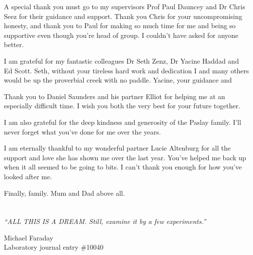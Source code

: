A special thank you must go to my supervisors Prof Paul Dauncey and Dr Chris Seez for their guidance and support. 
Thank you Chris for your uncompromising honesty, and thank you to Paul for making so much time for me and being so supportive even though you're head of group. I couldn't have asked for anyone better.

I am grateful for my fantastic colleagues Dr Seth Zenz, Dr Yacine Haddad and Ed Scott. 
Seth, without your tireless hard work and dedication I and many others would be up the proverbial creek with no paddle.
Yacine, your guidance and 

Thank you to Daniel Saunders and his partner Elliot for helping me at an especially difficult time.
I wish you both the very best for your future together.

I am also grateful for the deep kindness and generosity of the Paslay family. I'll never forget what you've done for me over the years. 

I am eternally thankful to my wonderful partner Lucie Altenburg for all the support and love she has shown me over the last year. 
You've helped me back up when it all seemed to be going to bits. I can't thank you enough for how you've looked after me. 

Finally, family. Mum and Dad above all. %



\tableofcontents
\listoffigures
\listoftables
%
\chapter*{\centering }
\begin{center}
\epigraph{\textit{``ALL THIS IS A DREAM. Still, examine it by a few experiments.''}}{Michael Faraday\\ Laboratory journal entry \#10040}
\end{center}

\cleardoublepage
